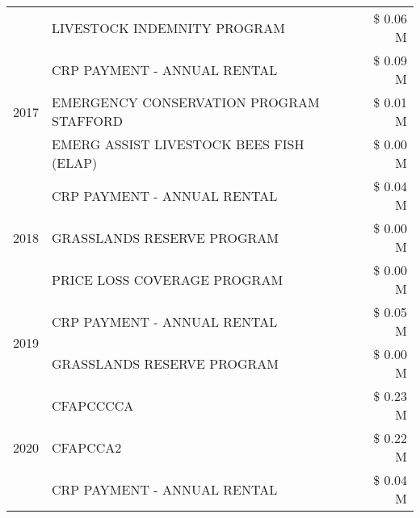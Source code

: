 \begin{tabular}{llr}
 & LIVESTOCK INDEMNITY PROGRAM & \$ 0.06 M \\
\cline{1-3}
\multirow[t]{3}{*}{2017} & CRP PAYMENT - ANNUAL RENTAL & \$ 0.09 M \\
 & EMERGENCY CONSERVATION PROGRAM STAFFORD & \$ 0.01 M \\
 & EMERG ASSIST LIVESTOCK BEES FISH (ELAP) & \$ 0.00 M \\
\cline{1-3}
\multirow[t]{3}{*}{2018} & CRP PAYMENT - ANNUAL RENTAL & \$ 0.04 M \\
 & GRASSLANDS RESERVE PROGRAM & \$ 0.00 M \\
 & PRICE LOSS COVERAGE PROGRAM & \$ 0.00 M \\
\cline{1-3}
\multirow[t]{2}{*}{2019} & CRP PAYMENT - ANNUAL RENTAL & \$ 0.05 M \\
 & GRASSLANDS RESERVE PROGRAM & \$ 0.00 M \\
\cline{1-3}
\multirow[t]{3}{*}{2020} & CFAPCCCCA & \$ 0.23 M \\
 & CFAPCCA2 & \$ 0.22 M \\
 & CRP PAYMENT - ANNUAL RENTAL & \$ 0.04 M \\
\cline{1-3}
\bottomrule
\end{tabular}
